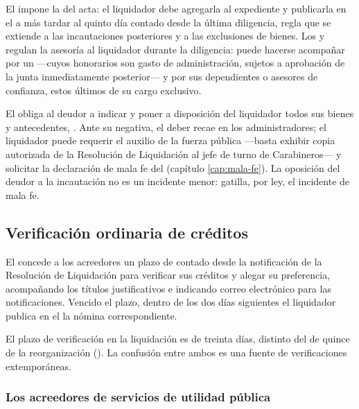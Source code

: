 El  impone la  del acta: el liquidador debe agregarla al
expediente y publicarla en el \boletin{} a más tardar al quinto día contado desde la última
diligencia, regla que se extiende a las incautaciones posteriores y a las exclusiones de bienes.
Los  y  regulan la asesoría al liquidador durante la diligencia: puede hacerse
acompañar por un  ---cuyos honorarios son gasto de
administración, sujetos a aprobación de la junta inmediatamente posterior--- y por sus
dependientes o asesores de confianza, estos últimos de su cargo exclusivo.

\begin{alerta}
El  obliga al deudor a indicar y poner a disposición del liquidador todos sus bienes y
antecedentes, . Ante su negativa, el deber recae en los administradores; el liquidador puede requerir el
auxilio de la fuerza pública ---basta exhibir copia autorizada de la Resolución de Liquidación al
jefe de turno de Carabineros--- y  solicitar la declaración de mala fe del
 (capítulo \ref{cap:mala-fe}). La oposición del deudor a la incautación no es un
incidente menor: gatilla, por ley, el incidente de mala fe.
\end{alerta}

\subsection{Verificación ordinaria de créditos}

El  concede a los acreedores un plazo de  contado desde la
notificación de la Resolución de Liquidación para verificar sus créditos y alegar su
preferencia, acompañando los títulos justificativos e indicando correo electrónico para las
notificaciones. Vencido el plazo, dentro de los dos días siguientes el liquidador publica en
el \boletin{} la nómina correspondiente.

\begin{alerta}
El plazo de verificación en la liquidación es de treinta días, distinto del de quince de la
reorganización (). La confusión entre ambos es una fuente de verificaciones
extemporáneas.
\end{alerta}

\subsubsection{Los acreedores de servicios de utilidad pública}

